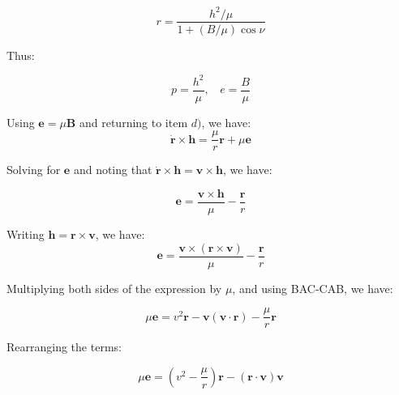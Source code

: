 \documentclass[11pt]{article}
\begin{document}
\begin{pproblem}
\begin{pssolution*}{}{}
\begin{alternativas}
            \[r = \frac{h^2/\mu}{1+(B/\mu)\cos\nu}\]

            Thus:

            \[\boxed{p = \frac{h^2}{\mu}, \ \ \ \ e = \frac{B}{\mu}}\]

            \item Using \(\mathbf{e} = \mu \mathbf{B}\) and returning to item \(d)\), we have:
            \[\dot{\mathbf{r}}\times \mathbf{h} = \frac{\mu}{r}\mathbf{r}+\mu \mathbf{e}\]

            Solving for \(\mathbf{e}\) and noting that \(\dot{\mathbf{r}}\times\mathbf{h} = \mathbf{v}\times\mathbf{h}\), we have:

            \[\boxed{\mathbf{e} = \frac{\mathbf{v}\times\mathbf{h}}{\mu} - \frac{\mathbf{r}}{r}}\]

            \item Writing \(\mathbf{h} = \mathbf{r}\times\mathbf{v}\), we have:
            \[\mathbf{e} = \frac{\mathbf{v}\times(\mathbf{r}\times\mathbf{v})}{\mu} - \frac{\mathbf{r}}{r} \]

            Multiplying both sides of the expression by \(\mu\), and using BAC-CAB, we have:

            \[\mu\mathbf{e} = v^2\mathbf{r} - \mathbf{v}(\mathbf{v}\cdot\mathbf{r}) - \frac{\mu}{r}\mathbf{r}\]

            Rearranging the terms:

            \[\boxed{\mu \mathbf{e} = (v^2-\frac{\mu}{r})\mathbf{r} - (\mathbf{r}\cdot\mathbf{v})\mathbf{v}}\]

            \end{alternativas}
    \end{pssolution*}
\end{pproblem}
\end{document}
